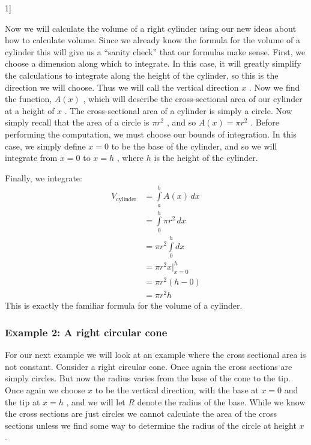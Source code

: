 1]


Now we will calculate the volume of a right cylinder using our new ideas
about how to calculate volume. Since we already know the formula for the
volume of a cylinder this will give us a ``sanity check'' that our
formulas make sense. First, we choose a dimension along which to
integrate. In this case, it will greatly simplify the calculations to
integrate along the height of the cylinder, so this is the direction we
will choose. Thus we will call the vertical direction $x$ . Now
we find the function, $A(x)$ , which will describe the cross-sectional
area of our cylinder at a height of $x$ . The cross-sectional area of a
cylinder is simply a circle. Now simply recall that the area of a circle
is $\pi r^2$ , and so $A(x)=\pi r^2$ . Before performing the
computation, we must choose our bounds of integration. In this case, we
simply define $x=0$ to be the base of the cylinder, and so we will integrate from $x=0$ to $x=h$ , where $h$ is the height of the cylinder.


Finally, we integrate:
\begin{align} V _{\text{cylinder}} &= \int\limits_a^b A(x)\,dx \\ &= \int\limits_0^h \pi r^2\,dx \\ &= \pi r^2 \int\limits_0^h dx \\ &= \pi r^2 x \bigg| _{x=0}^h \\ &= \pi r^2 (h - 0) \\ &= \pi r^2 h \end{align} 
This is exactly the familiar formula for the volume of a cylinder.


\subsubsection{Example 2: A right circular cone}
\label{sss:exam-c28b}
For our next example we will look at an example where the cross
sectional area is not constant. Consider a right circular cone. Once
again the cross sections are simply circles. But now the radius varies
from the base of the cone to the tip. Once again we choose $x$ to be the
vertical direction, with the base at $x=0$ and the tip at $x=h$ , and we
will let $R$ denote the radius of the base. While we know the cross
sections are just circles we cannot calculate the area of the cross
sections unless we find some way to determine the radius of the circle
at height $x$ .

